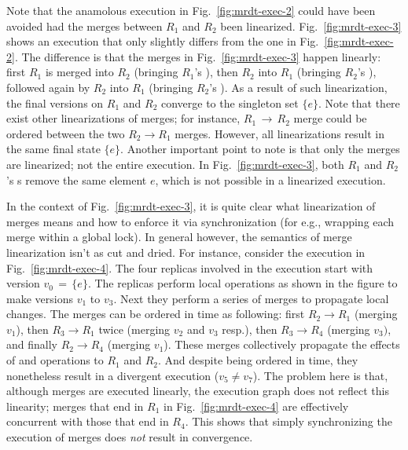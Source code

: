 Note that the anamolous execution in Fig.~\ref{fig:mrdt-exec-2} could
have been avoided had the merges between $R_1$ and $R_2$ been
linearized. Fig.~\ref{fig:mrdt-exec-3} shows an execution that only
slightly differs from the one in Fig.~\ref{fig:mrdt-exec-2}. The
difference is that the merges in Fig.~\ref{fig:mrdt-exec-3} happen
linearly: first $R_1$ is merged into $R_2$ (bringing $R_1$'s
), then $R_2$ into $R_1$ (bringing $R_2$'s ),
followed again by $R_2$ into $R_1$ (bringing $R_2$'s ). As a
result of such linearization, the final versions on $R_1$ and $R_2$
converge to the singleton set $\{e\}$. Note that there exist other
linearizations of merges; for instance, $R_1 \,\rightarrow\, R_2$
merge could be ordered between the two $R_2 \rightarrow R_1$ merges.
However, all linearizations result in the same final state $\{e\}$.
Another important point to note is that only the merges are
linearized; not the entire execution. In Fig.~\ref{fig:mrdt-exec-3},
both $R_1$ and $R_2$'s s remove the same element $e$, which
is not possible in a linearized execution. %

In the context of Fig.~\ref{fig:mrdt-exec-3}, it is quite clear what
linearization of merges means and how to enforce it via
synchronization (for e.g., wrapping each merge within a global lock).
In general however, the semantics of merge linearization isn't as cut
and dried. For instance, consider the execution in
Fig.~\ref{fig:mrdt-exec-4}. The four replicas involved in the
execution start with version $v_0 \,=\, \{e\}$. The replicas perform
local operations as shown in the figure to make versions $v_1$ to
$v_3$. Next they perform a series of merges to propagate local
changes. The merges can be ordered in time as following: first $R_2
\rightarrow R_1$ (merging $v_1$), then $R_3 \rightarrow R_1$ twice
(merging $v_2$ and $v_3$ resp.), then $R_3 \rightarrow R_4$ (merging
$v_3)$, and finally $R_2 \rightarrow R_4$ (merging $v_1$). These
merges collectively propagate the effects of  and 
operations to $R_1$ and $R_2$. And despite being ordered in time,
they nonetheless result in a divergent execution ($v_5 \neq v_7$). The
problem here is that, although merges are executed linearly, the
execution graph does not reflect this linearity; merges that end in
$R_1$ in Fig.~\ref{fig:mrdt-exec-4} are effectively concurrent with
those that end in $R_4$. This shows that simply synchronizing the
execution of merges does \emph{not} result in convergence.

